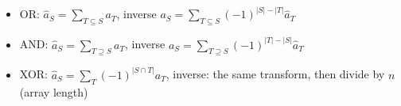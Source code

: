 \begin{itemize}
\item OR: $\hat a_S = \sum_{T \subseteq S} a_T$,
  inverse $a_S = \sum_{T \subseteq S} (-1)^{|S| - |T|} \hat a_T$
\item AND: $\hat a_S = \sum_{T \supseteq S} a_T$,
  inverse $a_S = \sum_{T \supseteq S} (-1)^{|T| - |S|} \hat a_T$
\item XOR: $\hat a_S = \sum_T (-1)^{|S \cap T|} a_T$,
  inverse: the same transform, then divide by $n$ (array length)
\end{itemize}
